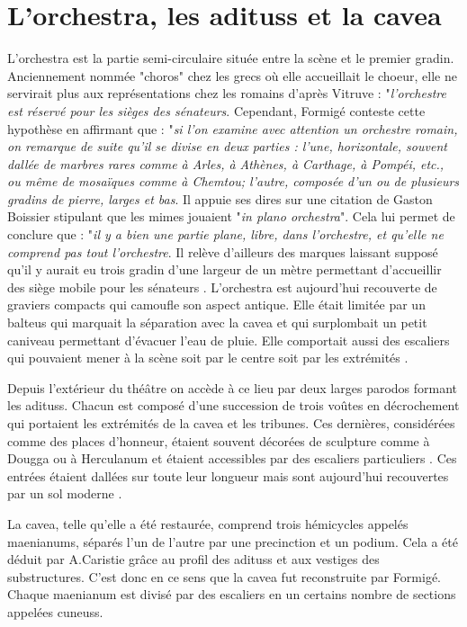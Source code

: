 		
\section{L'\gls{orchestra}, les \glspl{aditus} et la \gls{cavea}}		
	
	L'\gls{orchestra} est la partie semi-circulaire située entre la scène et le premier gradin. Anciennement nommée "choros" chez les grecs où elle accueillait le choeur, elle ne servirait plus aux représentations chez les romains d'après Vitruve \cite[p. 10]{vitruve} : "\textit{l'orchestre est réservé pour les sièges des sénateurs}. Cependant, Formigé \cite[p. 28-29]{formige} conteste cette hypothèse en affirmant que : "\textit{si l'on examine avec attention un orchestre romain, on remarque de suite qu'il se divise en deux parties : l'une, horizontale, souvent dallée de marbres rares comme à Arles, à Athènes, à Carthage, à Pompéi, etc., ou même de mosaïques comme à Chemtou; l'autre, composée d'un ou de plusieurs gradins de pierre, larges et bas}. Il appuie ses dires sur une citation de Gaston Boissier \cite[article MIMVS]{boissier} stipulant que les mimes jouaient "\textit{in plano orchestra}". Cela lui permet de conclure que : "\textit{il y a bien une partie plane, libre, dans l'orchestre, et qu'elle ne comprend pas tout l'orchestre}. Il relève d'ailleurs des marques laissant supposé qu'il y aurait eu trois gradin d'une largeur de un mètre permettant d'accueillir des siège mobile pour les sénateurs \cite[p. 455]{formigeBis}. L'\gls{orchestra} est aujourd'hui recouverte de graviers compacts qui camoufle son aspect antique. Elle était limitée par un \gls{balteus} qui marquait la séparation avec la \gls{cavea} et qui surplombait un petit caniveau permettant d'évacuer l'eau de pluie. Elle comportait aussi des escaliers qui pouvaient mener à la scène soit par le centre soit par les extrémités \citep[p. 52]{formige}.
	
	Depuis l'extérieur du théâtre on accède à ce lieu par deux larges \gls{parodos} formant les \glspl{aditus}. Chacun est composé d'une succession de trois voûtes en décrochement qui portaient les extrémités de la \gls{cavea} et les tribunes. Ces dernières, considérées comme des places d'honneur, étaient souvent décorées de sculpture comme à Dougga ou à Herculanum et étaient accessibles par des escaliers particuliers \citep[p. 37]{formige}. Ces entrées étaient dallées sur toute leur longueur mais sont aujourd'hui recouvertes par un sol moderne \cite[Pl. XVI]{orangePl}.
	
		La  \gls{cavea}, telle qu'elle a été restaurée, comprend trois hémicycles appelés \glspl{maenianum}, séparés l'un de l'autre par une \gls{precinction} et un \gls{podium}. Cela a été déduit par A.Caristie grâce au profil des \glspl{aditus} et aux vestiges des substructures. C'est donc en ce sens que la \gls{cavea} fut reconstruite par Formigé. Chaque \gls{maenianum} est divisé par des escaliers en un certains nombre de sections appelées \glspl{cuneus}.
		
